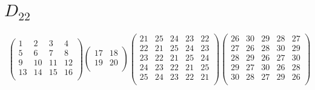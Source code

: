 \documentclass[12pt,a4paper]{amsart}
\begin{document}
\section*{$D_{22}$}
\begin{align*}
\left(\begin{array}{r|r|r|r}%
1&2&3&4\\%
\hline
5&6&7&8\\%
\hline
9&10&11&12\\%
\hline
13&14&15&16\\%
\end{array}\right)%
\left(\begin{array}{r|r}%
17&18\\%
\hline
19&20\\%
\end{array}\right)%
\left(\begin{array}{rrrrr}%
21&25&24&23&22\\%
22&21&25&24&23\\%
23&22&21&25&24\\%
24&23&22&21&25\\%
25&24&23&22&21\\%
\end{array}\right)%
\left(\begin{array}{rrrrr}%
26&30&29&28&27\\%
27&26&28&30&29\\%
28&29&26&27&30\\%
29&27&30&26&28\\%
30&28&27&29&26\\%
\end{array}\right)%
\end{align*}
\end{document}
